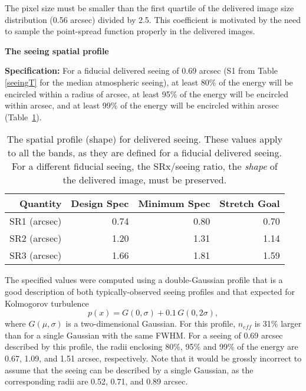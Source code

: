 The pixel size must be smaller than the first quartile of the delivered image
size distribution  (0.56 arcsec) divided by 2.5. This coefficient is motivated by the
need to sample the point-spread function properly in the delivered images.




\vskip 0.2in \leftline \textbf{ The seeing spatial profile}

\textbf{Specification:} For a fiducial delivered seeing of 0.69 arcsec
(S1 from Table \ref{seeingT} for the median atmospheric seeing), at least 80\%
of the energy will be encircled within a radius of
arcsec, at least 95\% of the energy will be encircled within
arcsec, and at least 99\% of the energy will be encircled within
arcsec
(Table~\ref{Tspatprof}).

\begin{table}[h]
\begin{tabular}{|r|r|r|r|}
\hline
       Quantity    & Design Spec & Minimum Spec & Stretch Goal \\
\hline
      SR1 (arcsec) &    0.74       &   0.80       &   0.70        \\
      SR2 (arcsec) &    1.20       &   1.31       &   1.14        \\
      SR3 (arcsec) &    1.66       &   1.81       &   1.59        \\
\hline
\end{tabular}
\caption{The spatial profile (shape) for delivered seeing. These values
  apply to all the bands, as they are defined for a
  fiducial delivered seeing. For a different fiducial seeing, the
  SRx/seeing ratio, \ie the \textit{shape} of the delivered image,
  must be preserved.}
\label{Tspatprof}
\end{table}

The specified values were computed using a double-Gaussian profile that is
a good description of both typically-observed seeing profiles and that
expected for Kolmogorov turbulence
\begin{equation}
       p(x) = G(0,\sigma) + 0.1\, G(0,2\sigma),
\end{equation}
where $G(\mu,\sigma)$ is a two-dimensional Gaussian. For this profile,
$n_{eff}$ is 31\% larger than for a single Gaussian with the same FWHM. For
a seeing of 0.69 arcsec described by this profile, the radii enclosing
80\%, 95\% and 99\% of the energy are 0.67, 1.09, and 1.51 arcsec,
respectively. Note that it would be grossly incorrect to assume that the
seeing can be described by a single Gaussian, as the corresponding radii
are 0.52, 0.71, and 0.89 arcsec.

